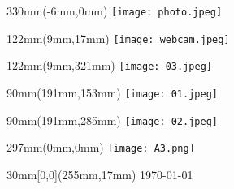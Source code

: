 \documentclass[12pt]{article}
\begin{document}
\begin{textblock*}{330mm}(-6mm,0mm)%
	\texttt{[image: photo.jpeg]}
\end{textblock*}

\begin{textblock*}{122mm}(9mm,17mm)%
	\texttt{[image: webcam.jpeg]}
\end{textblock*}

\begin{textblock*}{122mm}(9mm,321mm)%
	\texttt{[image: 03.jpeg]}
\end{textblock*}

\begin{textblock*}{90mm}(191mm,153mm)%
	\texttt{[image: 01.jpeg]}
\end{textblock*}

\begin{textblock*}{90mm}(191mm,285mm)%
	\texttt{[image: 02.jpeg]}
\end{textblock*}

\begin{textblock*}{297mm}(0mm,0mm)%
	\texttt{[image: A3.png]}
\end{textblock*}

\TPMargin{5mm}
\begin{textblock*}{30mm}[0,0](255mm,17mm)
\noindent
\today \\
\currenttime
{}
\end{textblock*}

\TPMargin{3mm}
\end{document}
